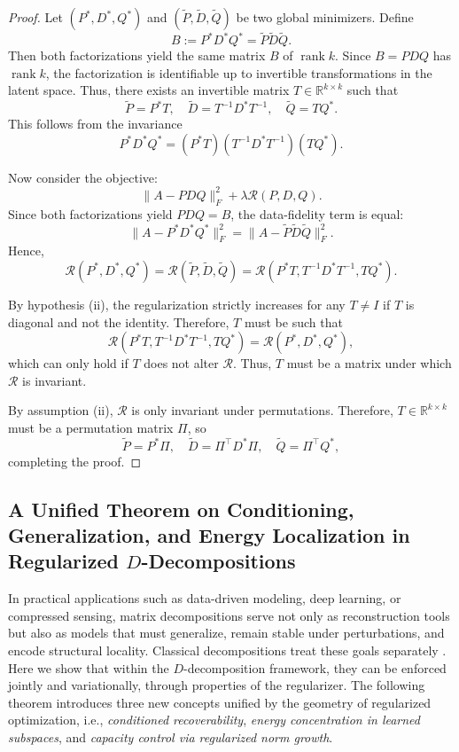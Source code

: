 \documentclass[10pt,a4paper]{article}
\begin{document}
\begin{proof}
Let \( (P^*, D^*, Q^*) \) and \( (\tilde{P}, \tilde{D}, \tilde{Q}) \) be two global minimizers. Define
\[
B := P^* D^* Q^* = \tilde{P} \tilde{D} \tilde{Q}.
\]
Then both factorizations yield the same matrix \( B \) of \( \operatorname{rank} k \). Since \( B = P D Q \) has \( \operatorname{rank} k \), the factorization is identifiable up to invertible transformations in the latent space. Thus, there exists an invertible matrix \( T \in \mathbb{R}^{k \times k} \) such that
\[
\tilde{P} = P^* T, \quad \tilde{D} = T^{-1} D^* T^{-1}, \quad \tilde{Q} = T Q^*.
\]
This follows from the invariance
\[
P^* D^* Q^* = (P^* T)(T^{-1} D^* T^{-1})(T Q^*).
\]

Now consider the objective:
\[
\|A - P D Q\|_F^2 + \lambda \mathcal{R}(P, D, Q).
\]
Since both factorizations yield \( P D Q = B \), the data-fidelity term is equal:
\[
\|A - P^* D^* Q^*\|_F^2 = \|A - \tilde{P} \tilde{D} \tilde{Q}\|_F^2.
\]
Hence,
\[
\mathcal{R}(P^*, D^*, Q^*) = \mathcal{R}(\tilde{P}, \tilde{D}, \tilde{Q}) = \mathcal{R}(P^* T, T^{-1} D^* T^{-1}, T Q^*).
\]

By hypothesis (ii), the regularization strictly increases for any \( T \ne I \) if \( T \) is diagonal and not the identity. Therefore, \( T \) must be such that
\[
\mathcal{R}(P^* T, T^{-1} D^* T^{-1}, T Q^*) = \mathcal{R}(P^*, D^*, Q^*),
\]
which can only hold if \( T \) does not alter \( \mathcal{R} \). Thus, \( T \) must be a matrix under which \( \mathcal{R} \) is invariant.

By assumption (ii), \( \mathcal{R} \) is only invariant under permutations. Therefore, \( T \in \mathbb{R}^{k \times k} \) must be a permutation matrix \( \Pi \), so
\[
\tilde{P} = P^* \Pi, \quad \tilde{D} = \Pi^\top D^* \Pi, \quad \tilde{Q} = \Pi^\top Q^*,
\]
completing the proof.
\end{proof}

\subsection{A Unified Theorem on Conditioning, Generalization, and Energy Localization in Regularized $D$-Decompositions}

In practical applications such as data-driven modeling, deep learning, or compressed sensing, matrix decompositions serve not only as reconstruction tools but also as models that must generalize, remain stable under perturbations, and encode structural locality. Classical decompositions treat these goals separately \cite{huang2024regularized}. Here we show that within the $D$-decomposition framework, they can be enforced jointly and variationally, through properties of the regularizer. The following theorem introduces three new concepts unified by the geometry of regularized optimization, i.e., \emph{conditioned recoverability}, \emph{energy concentration in learned subspaces}, and \emph{capacity control via regularized norm growth}.
\end{document}
